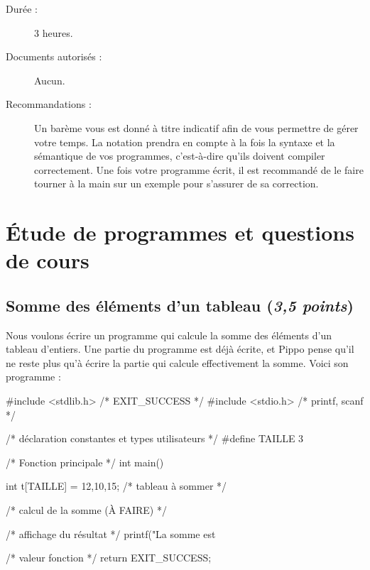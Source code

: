 
\setcounter{questioncount}{0}
\newcommand{\question}{\addtocounter{questioncount}{1}\paragraph{Question \Alph{questioncount}.}}
\newcommand{\commentaire}[1]{}

\vspace{-1cm}
\begin{description}
\item[Durée :] 3 heures.
\item[Documents autorisés :] Aucun.
\item[Recommandations :] Un barème vous est donné à
titre indicatif afin de vous permettre de gérer votre temps. La
notation prendra en compte à la fois la syntaxe et la sémantique de
vos programmes, c'est-à-dire qu'ils doivent compiler correctement. Une
fois votre programme écrit, il est recommandé de le faire tourner à la
main sur un exemple pour s'assurer de sa correction.
\end{description}


\section{Étude de programmes et questions de cours}

\subsection{Somme des éléments d'un tableau (\textit{3,5 points})}

Nous voulons écrire un programme qui calcule la somme des éléments
d'un tableau d'entiers. Une partie du programme est déjà écrite, et
Pippo pense qu'il ne
reste plus qu'à écrire la partie qui calcule effectivement la
somme. Voici son programme :
\begin{listing}{1}
#include <stdlib.h> /* EXIT_SUCCESS */
#include <stdio.h> /* printf, scanf */

/* déclaration constantes et types utilisateurs */
#define TAILLE 3

/* Fonction principale */
int main()
{
  int t[TAILLE] = {12,10,15}; /* tableau à sommer */



  /* calcul de la somme (À FAIRE) */





  /* affichage du résultat */
  printf("La somme est %

  /* valeur fonction */
  return EXIT_SUCCESS;
}
\end{listing}

